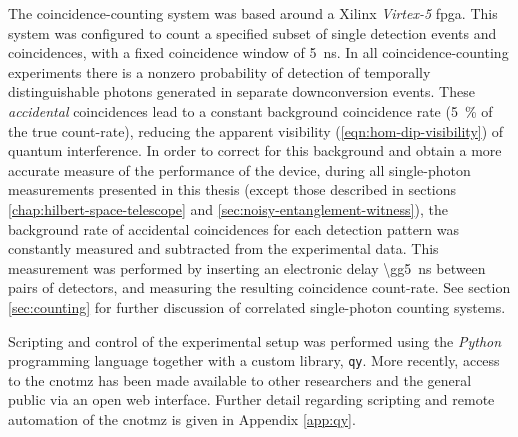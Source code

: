 The coincidence-counting system was based around a Xilinx \emph{Virtex-5} \gls{fpga}. This system was configured to count a specified subset of single detection events and coincidences, with a fixed coincidence window of \SI{5}{\nano\second}. In all coincidence-counting experiments there is a nonzero probability of detection of temporally distinguishable photons generated in separate downconversion events. These \emph{accidental} coincidences lead to a constant background coincidence rate (\SI{5}{\percent} of the true count-rate), reducing the apparent visibility (\ref{eqn:hom-dip-visibility}) of quantum interference.  In order to correct for this background and obtain a more accurate measure of the performance of the device, during all single-photon measurements presented in this thesis (except those described in sections \ref{chap:hilbert-space-telescope} and \ref{sec:noisy-entanglement-witness}), the background rate of accidental coincidences for each detection pattern was constantly measured and subtracted from the experimental data. This measurement was performed by inserting an electronic delay \SI{\gg5}{\nano\second} between pairs of detectors, and measuring the resulting coincidence count-rate.
See section \ref{sec:counting} for further discussion of correlated single-photon counting systems.

Scripting and control of the experimental setup was performed using the \emph{Python} programming language together with a custom library, \texttt{qy}. 
More recently, access to the \gls{cnotmz} has been made available to other researchers and the general public via an open web interface. Further detail regarding scripting and remote automation of the \gls{cnotmz} is given in Appendix \ref{app:qy}.

